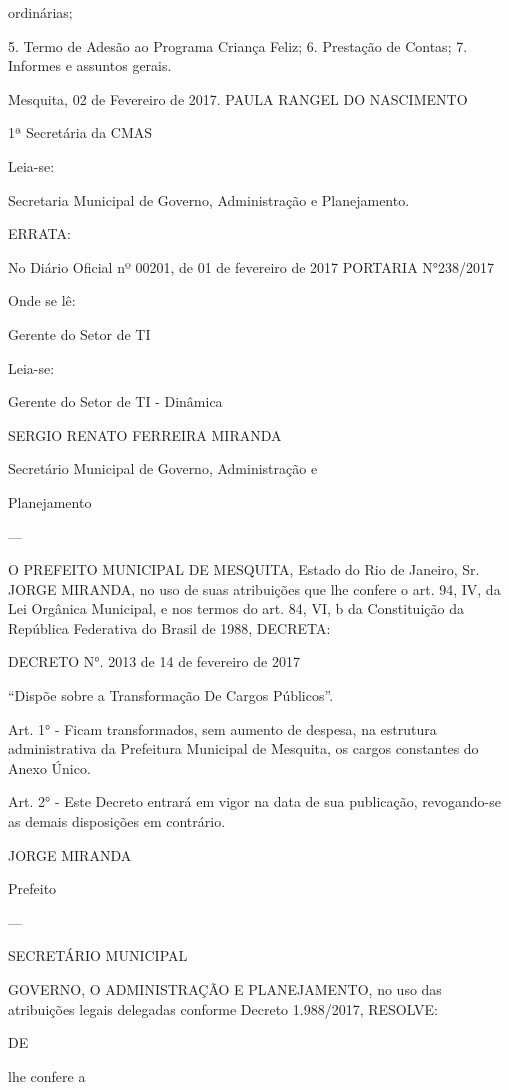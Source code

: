 \documentclass{doliberto}
\begin{document}
ordinárias; 

5.  Termo de Adesão ao Programa Criança Feliz; 
6.  Prestação de Contas; 
7.  Informes e assuntos gerais. 

 

Mesquita, 02 de Fevereiro de 2017. 
PAULA RANGEL DO NASCIMENTO 

1ª Secretária da CMAS 
 
Leia-se: 

Secretaria Municipal de Governo, Administração e 
Planejamento. 

ERRATA: 
 
No Diário Oficial nº 00201, de 01 de fevereiro de 2017 
PORTARIA N°238/2017 
 
Onde se lê: 
 
Gerente do Setor de TI 
 
Leia-se: 
 
Gerente do Setor de TI - Dinâmica 
 
SERGIO RENATO FERREIRA MIRANDA 

Secretário Municipal de Governo, Administração e 

Planejamento 

---

O PREFEITO MUNICIPAL DE MESQUITA, Estado do Rio de 
Janeiro,  Sr.  JORGE  MIRANDA,  no  uso  de  suas  atribuições 
que  lhe  confere  o  art.  94,  IV,  da  Lei  Orgânica  Municipal,  e 
nos  termos  do  art.  84,  VI,  b  da  Constituição  da  República 
Federativa do Brasil de 1988, DECRETA: 

DECRETO N°. 2013 de 14 de fevereiro de 2017 

“Dispõe sobre a Transformação De Cargos Públicos”. 

Art. 1° - Ficam transformados, sem aumento de despesa, na 
estrutura  administrativa  da  Prefeitura  Municipal  de 
Mesquita, os cargos constantes do Anexo Único. 

Art.  2°  -  Este  Decreto  entrará  em  vigor  na  data  de  sua 
publicação,  revogando-se  as  demais  disposições  em 
contrário. 

JORGE MIRANDA 

Prefeito 

---

SECRETÁRIO  MUNICIPAL 

GOVERNO, 
O 
ADMINISTRAÇÃO  E  PLANEJAMENTO,  no  uso  das 
atribuições legais delegadas conforme Decreto 1.988/2017, 
RESOLVE: 

DE 

lhe  confere  a 
\end{document}
